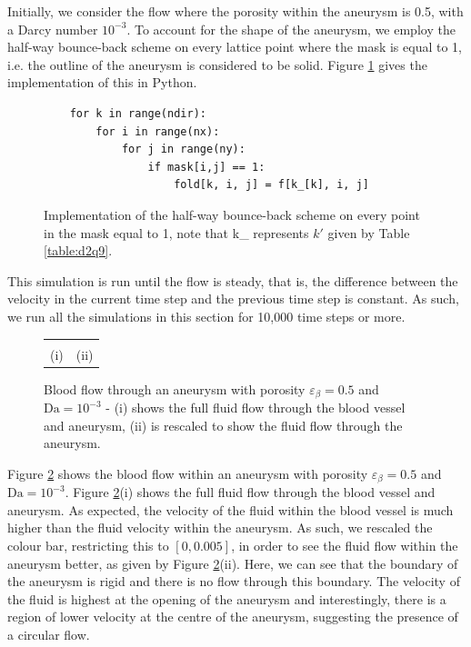 \documentclass[a4paper, 11pt]{report}
\begin{document}
Initially, we consider the flow where the porosity within the aneurysm is 0.5, with a Darcy number $10^{-3}$. To account for the shape of the aneurysm, we employ the half-way bounce-back scheme on every lattice point where the mask is equal to 1, i.e. the outline of the aneurysm is considered to be solid. Figure \ref{fig:an_hbb} gives the implementation of this in Python.

\begin{figure}[!htb]{\small
\begin{mdframed}[backgroundcolor=red!10, linecolor=red!10]
\begin{verbatim}
    for k in range(ndir):
        for i in range(nx):
            for j in range(ny):
                if mask[i,j] == 1:
                    fold[k, i, j] = f[k_[k], i, j]
\end{verbatim}
\end{mdframed}
}
\caption[Python implementation of the half-way bounce-back scheme on aneurysm]{Implementation of the half-way bounce-back scheme on every point in the mask equal to 1, note that {\selectfont k\_} represents $k'$ given by Table \ref{table:d2q9}.} \label{fig:an_hbb}
\end{figure}
\newpage
This simulation is run until the flow is steady, that is, the difference between the velocity in the current time step and the previous time step is constant. As such, we run all the simulations in this section for 10,000 time steps or more. 
\begin{figure}[!hbt]
    \centering
    \begin{tabular}{c c}
      &  \\
    (i) & (ii)
    \end{tabular}
    \caption[Blood flow through an aneurysm with porosity $\varepsilon_\beta=0.5$ and $\mathrm{Da}=10^{-3}$]{Blood flow through an aneurysm with porosity $\varepsilon_\beta=0.5$ and $\mathrm{Da}=10^{-3}$ - (i) shows the full fluid flow through the blood vessel and aneurysm, (ii) is rescaled to show the fluid flow through the aneurysm.} \label{fig:an_0.5}
\end{figure}
\vspace{-5mm}

Figure \ref{fig:an_0.5} shows the blood flow within an aneurysm with porosity $\varepsilon_\beta=0.5$ and $\mathrm{Da}=10^{-3}$. Figure \ref{fig:an_0.5}(i) shows the full fluid flow through the blood vessel and aneurysm. As expected, the velocity of the fluid within the blood vessel is much higher than the fluid velocity within the aneurysm. As such, we rescaled the colour bar, restricting this to $[0,0.005]$, in order to see the fluid flow within the aneurysm better, as given by Figure \ref{fig:an_0.5}(ii). Here, we can see that the boundary of the aneurysm is rigid and there is no flow through this boundary. The velocity of the fluid is highest at the opening of the aneurysm and interestingly, there is a region of lower velocity at the centre of the aneurysm, suggesting the presence of a circular flow. 
\end{document}
